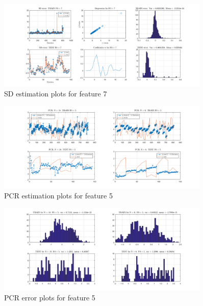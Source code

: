 \documentclass{article}
\begin{document}
\begin{figure}[H]
	\centering
	\includegraphics[width=0.9\textwidth]{pictures/SD_F7_FINAL.png}
	\caption{SD estimation plots for feature 7}\label{fig:SD_F7_FINAL}
\end{figure}

\label{lst: PCR coefficients function}
\label{lst: PCR plot function}

\begin{figure}[H]
	\centering
	\includegraphics[width=0.9\textwidth]{pictures/PCR_F5_FINAL.png}
	\caption{PCR estimation plots for feature 5}\label{fig:PCR_F5_FINAL}
\end{figure}

\begin{figure}[H]
	\centering
	\includegraphics[width=0.9\textwidth]{pictures/PCR_F5_ERRORS.png}
	\caption{PCR error plots for feature 5}\label{fig:PCR_F5_ERRORS}
\end{figure}
\end{document}
